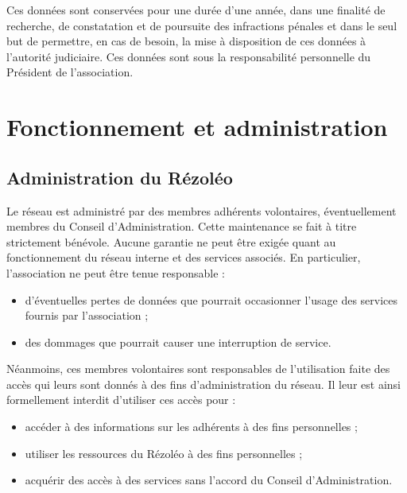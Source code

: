 \documentclass[12pt]{article}
\begin{document}
		Ces données sont conservées pour une durée d'une année, dans une finalité de recherche, de constatation et de poursuite des infractions pénales et dans le seul but de permettre, en cas de besoin, la mise à disposition de ces données à l'autorité judiciaire.
		Ces données sont sous la responsabilité personnelle du Président de l'association.

\section{Fonctionnement et administration}

    \subsection{Administration du Rézoléo}
		                                        
		Le réseau est administré par des membres adhérents volontaires, éventuellement membres du Conseil d’Administration. Cette maintenance se fait à titre strictement bénévole. Aucune garantie ne peut être exigée quant au fonctionnement du réseau interne et des services associés. En particulier, l’association ne peut être tenue responsable :

		\begin{itemize}
			\item[\textbullet] d’éventuelles pertes de données que pourrait occasionner l’usage des services fournis par l’association ;
	 		\item[\textbullet] des dommages que pourrait causer une interruption de service. 
 		\end{itemize}
                                          
		Néanmoins, ces membres volontaires sont responsables de l’utilisation faite des accès qui leurs sont donnés à des fins d’administration du réseau. Il leur est ainsi formellement interdit d’utiliser ces accès pour :

		\begin{itemize}                                 
			 \item[\textbullet] accéder à des informations sur les adhérents à des fins personnelles ;
			 \item[\textbullet] utiliser les ressources du Rézoléo à des fins personnelles ;
			 \item[\textbullet] acquérir des accès à des services sans l’accord du Conseil d’Administration. 
		\end{itemize}
                            
\end{document}
